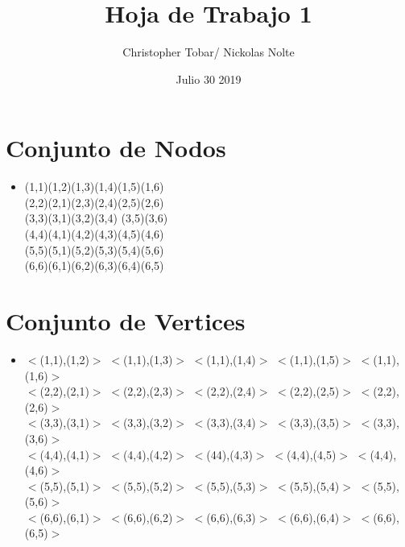 \documentclass{article}
\title{Hoja de Trabajo 1}
\author{Christopher Tobar/ Nickolas Nolte }
\date{Julio 30 2019}
\begin{document}
\maketitle

\section{Conjunto de Nodos}
\begin{itemize}
    \item 

        (1,1)\quad(1,2)\quad(1,3)\quad(1,4)\quad(1,5)\quad(1,6)\\
        (2,2)\quad(2,1)\quad(2,3)\quad(2,4)\quad(2,5)\quad(2,6)\\
        (3,3)\quad(3,1)\quad(3,2)\quad(3,4)\quad
        (3,5)\quad(3,6)\\
        (4,4)\quad(4,1)\quad(4,2)\quad(4,3)\quad(4,5)\quad(4,6)\\  
        (5,5)\quad(5,1)\quad(5,2)\quad(5,3)\quad(5,4)\quad(5,6)\\
        (6,6)\quad(6,1)\quad(6,2)\quad(6,3)\quad(6,4)\quad(6,5)\\
\end{itemize}


\section{Conjunto de Vertices}
\begin{itemize}
    \item 

$<$(1,1),(1,2)$>$     $<$(1,1),(1,3)$>$     $<$(1,1),(1,4)$>$     $<$(1,1),(1,5)$>$     $<$(1,1),(1,6)$>$\\
$<$(2,2),(2,1)$>$     $<$(2,2),(2,3)$>$     $<$(2,2),(2,4)$>$     $<$(2,2),(2,5)$>$     $<$(2,2),(2,6)$>$\\
$<$(3,3),(3,1)$>$     $<$(3,3),(3,2)$>$     $<$(3,3),(3,4)$>$     $<$(3,3),(3,5)$>$    $<$(3,3),(3,6)$>$\\
$<$(4,4),(4,1)$>$     $<$(4,4),(4,2)$>$     $<$(44),(4,3)$>$     $<$(4,4),(4,5)$>$    $<$(4,4),(4,6)$>$\\
$<$(5,5),(5,1)$>$     $<$(5,5),(5,2)$>$     $<$(5,5),(5,3)$>$     $<$(5,5),(5,4)$>$    $<$(5,5),(5,6)$>$\\
$<$(6,6),(6,1)$>$     $<$(6,6),(6,2)$>$     $<$(6,6),(6,3)$>$     $<$(6,6),(6,4)$>$    $<$(6,6),(6,5)$>$\\

\end{itemize}
\end{document}
